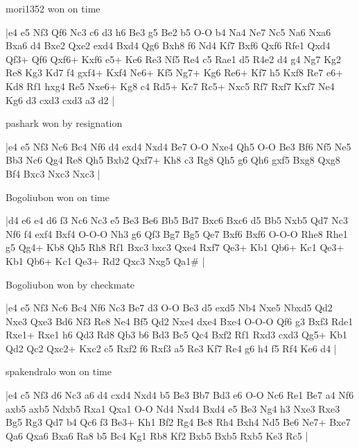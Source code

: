 \showboard

mori1352 won on time

\makegametitle
|e4 e5 Nf3 Qf6 Nc3 c6 d3 h6 Be3 g5 Be2 b5 O-O b4 Na4 Ne7 Nc5 Na6 Nxa6 Bxa6 d4 Bxe2 Qxe2 exd4 Bxd4 Qg6 Bxh8 f6 Nd4 Kf7 Bxf6 Qxf6 Rfe1 Qxd4 Qf3+ Qf6 Qxf6+ Kxf6 e5+ Ke6 Re3 Nf5 Re4 c5 Rae1 d5 R4e2 d4 g4 Ng7 Kg2 Re8 Kg3 Kd7 f4 gxf4+ Kxf4 Ne6+ Kf5 Ng7+ Kg6 Re6+ Kf7 h5 Kxf8 Re7 e6+ Kd8 Rf1 hxg4 Re5 Nxe6+ Kg8 c4 Rd5+ Kc7 Rc5+ Nxc5 Rf7 Rxf7 Kxf7 Ne4 Kg6 d3 cxd3 cxd3 a3 d2  |

\showboard

pashark won by resignation

\makegametitle
|e4 e5 Nf3 Nc6 Bc4 Nf6 d4 exd4 Nxd4 Be7 O-O Nxe4 Qh5 O-O Be3 Bf6 Nf5 Ne5 Bb3 Nc6 Qg4 Re8 Qh5 Bxb2 Qxf7+ Kh8 c3 Rg8 Qh5 g6 Qh6 gxf5 Bxg8 Qxg8 Bf4 Bxc3 Nxc3 Nxc3  |

\showboard

Bogoliubon won on time

\makegametitle
|d4 e6 e4 d6 f3 Nc6 Nc3 e5 Be3 Be6 Bb5 Bd7 Bxc6 Bxc6 d5 Bb5 Nxb5 Qd7 Nc3 Nf6 f4 exf4 Bxf4 O-O-O Nh3 g6 Qf3 Bg7 Bg5 Qe7 Bxf6 Bxf6 O-O-O Rhe8 Rhe1 g5 Qg4+ Kb8 Qh5 Rh8 Rf1 Bxc3 bxc3 Qxe4 Rxf7 Qe3+ Kb1 Qb6+ Kc1 Qe3+ Kb1 Qb6+ Kc1 Qe3+ Rd2 Qxc3 Nxg5 Qa1\#  |

\showboard

Bogoliubon won by checkmate

\makegametitle
|e4 e5 Nf3 Nc6 Bc4 Nf6 Nc3 Be7 d3 O-O Be3 d5 exd5 Nb4 Nxe5 Nbxd5 Qd2 Nxe3 Qxe3 Bd6 Nf3 Re8 Ne4 Bf5 Qd2 Nxe4 dxe4 Bxe4 O-O-O Qf6 g3 Bxf3 Rde1 Rxe1+ Rxe1 h6 Qd3 Rd8 Qb3 b6 Bd3 Bc5 Qc4 Bxf2 Rf1 Rxd3 cxd3 Qg5+ Kb1 Qd2 Qc2 Qxc2+ Kxc2 c5 Rxf2 f6 Rxf3 a5 Re3 Kf7 Re4 g6 h4 f5 Rf4 Ke6 d4  |

\showboard

spakendralo won on time

\makegametitle
|e4 c5 Nf3 d6 Nc3 a6 d4 cxd4 Nxd4 b5 Be3 Bb7 Bd3 e6 O-O Nc6 Re1 Be7 a4 Nf6 axb5 axb5 Ndxb5 Rxa1 Qxa1 O-O Nd4 Nxd4 Bxd4 e5 Be3 Ng4 h3 Nxe3 Rxe3 Bg5 Rg3 Qd7 b4 Qc6 f3 Be3+ Kh1 Bf2 Rg4 Bc8 Rh4 Bxh4 Nd5 Be6 Ne7+ Bxe7 Qa6 Qxa6 Bxa6 Ra8 b5 Bc4 Kg1 Rb8 Kf2 Bxb5 Bxb5 Rxb5 Ke3 Rc5  |


